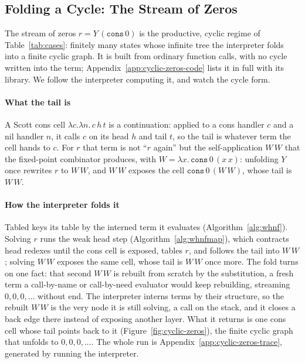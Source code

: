 \subsection{Folding a Cycle: The Stream of Zeros}\label{sec:application-cycles}

The stream of zeros $r = Y\,(\mathtt{cons}\,0)$ is the productive, cyclic regime of Table~\ref{tab:cases}: finitely many states whose infinite tree the interpreter folds into a finite cyclic graph. It is built from ordinary function calls, with no cycle written into the term; Appendix~\ref{app:cyclic-zeros-code} lists it in full with its library. We follow the interpreter computing it, and watch the cycle form.

\paragraph{What the tail is}
A Scott cons cell $\lambda c.\lambda n.\,c\,h\,t$ is a continuation: applied to a cons handler $c$ and a nil handler $n$, it calls $c$ on its head $h$ and tail $t$, so the tail is whatever term the cell hands to $c$. For $r$ that term is not ``$r$ again'' but the self-application $W\,W$ that the fixed-point combinator produces, with $W = \lambda x.\,\mathtt{cons}\,0\,(x\,x)$: unfolding $Y$ once rewrites $r$ to $W\,W$, and $W\,W$ exposes the cell $\mathtt{cons}\,0\,(W\,W)$, whose tail is $W\,W$.

\paragraph{How the interpreter folds it}
\textsf{Tabled} keys its table by the interned term it evaluates (Algorithm~\ref{alg:whnf}). Solving $r$ runs the weak head step (Algorithm~\ref{alg:whnfmap}), which contracts head redexes until the cons cell is exposed, tables $r$, and follows the tail into $W\,W$; solving $W\,W$ exposes the same cell, whose tail is $W\,W$ once more. The fold turns on one fact: that second $W\,W$ is rebuilt from scratch by the substitution, a fresh term a call-by-name or call-by-need evaluator would keep rebuilding, streaming $0,0,0,\dots$ without end. The interpreter interns terms by their structure, so the rebuilt $W\,W$ is the very node it is still solving, a call on the stack, and it closes a back edge there instead of exposing another layer. What it returns is one cons cell whose tail points back to it (Figure~\ref{fig:cyclic-zeros}), the finite cyclic graph that unfolds to $0,0,0,\dots$. The whole run is Appendix~\ref{app:cyclic-zeros-trace}, generated by running the interpreter.


